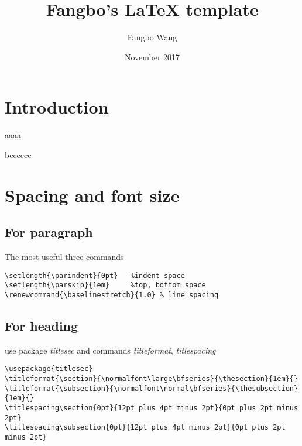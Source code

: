 \documentclass[12pt]{article}
\title{Fangbo's \LaTeX{} template}
\author{Fangbo Wang \\   }
\date{November 2017}
\renewcommand{\baselinestretch}{1.0} %
\begin{document}
\maketitle
\tableofcontents

\newpage
\section{Introduction}
aaaa 

bcccccc
\section{Spacing and font size}

\subsection{For paragraph}
The most useful three commands
\begin{lstlisting}
\setlength{\parindent}{0pt}   %indent space
\setlength{\parskip}{1em}     %top, bottom space
\renewcommand{\baselinestretch}{1.0} % line spacing
\end{lstlisting}

\subsection{For heading}
use package \textit{titlesec} and commands \textit{titleformat}, \textit{titlespacing}
\begin{lstlisting}
\usepackage{titlesec}
\titleformat{\section}{\normalfont\large\bfseries}{\thesection}{1em}{}
\titleformat{\subsection}{\normalfont\normal\bfseries}{\thesubsection}{1em}{}
\titlespacing\section{0pt}{12pt plus 4pt minus 2pt}{0pt plus 2pt minus 2pt}
\titlespacing\subsection{0pt}{12pt plus 4pt minus 2pt}{0pt plus 2pt minus 2pt}
\end{lstlisting}
\end{document}
